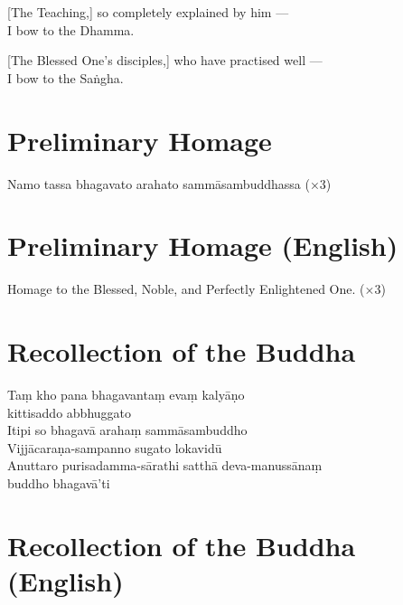 [The Teaching,] so completely explained by him ---\\
I bow to the Dhamma. 

[The Blessed One's disciples,] who have practised well ---\\
I bow to the Saṅgha. 

\section*{Preliminary Homage}

\begin{leader}
\end{leader}

Namo tassa bhagavato arahato sammāsambuddhassa (×3)

\section*{Preliminary Homage (English)}

\begin{leader}
\end{leader}

Homage to the Blessed, Noble, and Perfectly Enlightened One. (×3)

\section*{Recollection of the Buddha}

\begin{leader}
\end{leader}

Taṃ kho pana bhagavantaṃ evaṃ kalyāṇo\\
\vin kittisaddo abbhuggato\\
Itipi so bhagavā arahaṃ sammāsambuddho\\
Vijjācaraṇa-sampanno sugato lokavidū\\
Anuttaro purisadamma-sārathi satthā deva-manussānaṃ\\
\vin buddho bhagavā'ti

\section*{Recollection of the Buddha (English)}

\begin{leader}
\end{leader}

